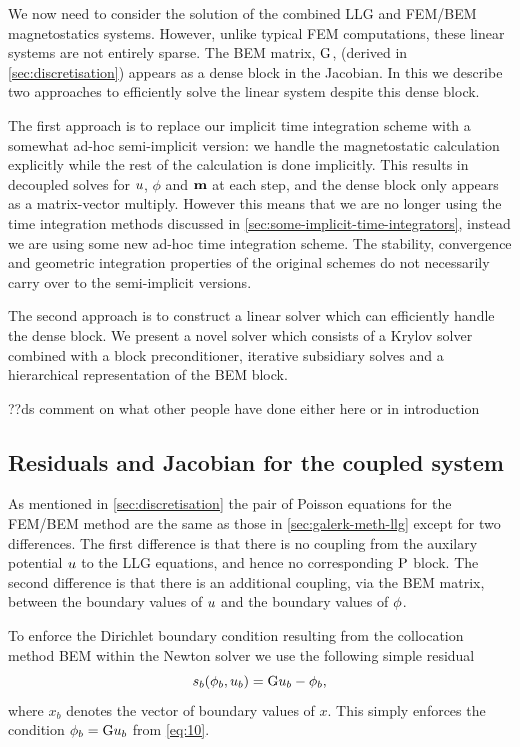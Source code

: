 We now need to consider the solution of the combined LLG and FEM/BEM magnetostatics systems.
However, unlike typical FEM computations, these linear systems are not entirely sparse.
The BEM matrix, ${\mathbf{\mathrm{G}}}$, (derived in \cref{sec:discretisation}) appears as a dense block in the Jacobian.
In this  we describe two approaches to efficiently solve the linear system despite this dense block.

The first approach is to replace our implicit time integration scheme with a somewhat ad-hoc semi-implicit version: we handle the magnetostatic calculation explicitly while the rest of the calculation is done implicitly.
This results in decoupled solves for $u$, $\phi$ and $\boldsymbol{\mathrm{m}}$ at each step, and the dense block only appears as a matrix-vector multiply.
However this means that we are no longer using the time integration methods discussed in \cref{sec:some-implicit-time-integrators}, instead we are using some new ad-hoc time integration scheme.
The stability, convergence and geometric integration properties of the original schemes do not necessarily carry over to the semi-implicit versions.

The second approach is to construct a linear solver which can efficiently handle the dense block.
We present a novel solver which consists of a Krylov solver combined with a block preconditioner, iterative subsidiary solves and a hierarchical representation of the BEM block.


??ds comment on what other people have done either here or in introduction


\subsection{Residuals and Jacobian for the coupled system}
\label{sec:bem-jacobian-structure}

As mentioned in \cref{sec:discretisation} the pair of Poisson equations for the FEM/BEM method are the same as those in \cref{sec:galerk-meth-llg} except for two differences.
The first difference is that there is no coupling from the auxilary potential $u$ to the LLG equations, and hence no corresponding $\mathrm{P}$ block.
The second difference is that there is an additional coupling, via the BEM matrix, between the boundary values of $u$ and the boundary values of $\phi$.

To enforce the Dirichlet boundary condition resulting from the collocation method BEM within the Newton solver we use the following simple residual
\newcommand{\rphimb}{\rphi_b}
\begin{equation}
  \rphimb(\phim_b, \phione_b) = \bm \phione_b - \phim_b,
\end{equation}
where $x_b$ denotes the vector of boundary values of $x$.
This simply enforces the condition $\phi_b = {\mathbf{\mathrm{G}}} u_b$ from \cref{eq:10}.

